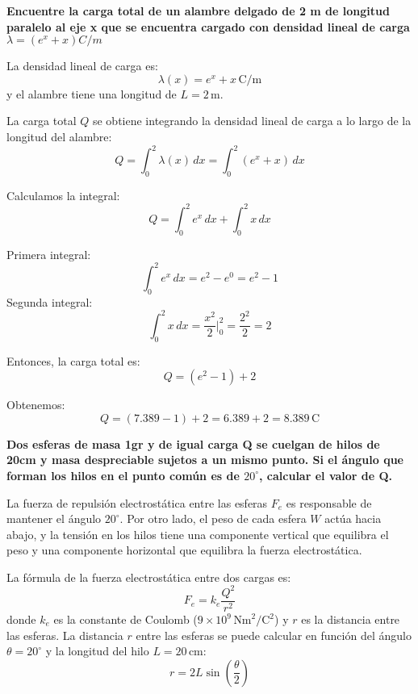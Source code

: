 \documentclass[answers]{exam} %
\begin{document}
\begin{questions}
	\vspace{0.5cm}

	\question \large\textbf{Encuentre la carga total de un alambre delgado de 2 m de longitud paralelo al eje x que se encuentra cargado con densidad lineal de carga $\lambda = (e^x + x) C/m$  }

	\vspace{0.5cm}

	\begin{multicols}{2} %
		La densidad lineal de carga es:
		\[
			\lambda(x) = e^x + x \, \text{C/m}
		\]
		y el alambre tiene una longitud de \( L = 2 \, \text{m} \).

		La carga total \( Q \) se obtiene integrando la densidad lineal de carga a lo largo de la longitud del alambre:
		\[
			Q = \int_0^2 \lambda(x) \, dx = \int_0^2 (e^x + x) \, dx
		\]

		Calculamos la integral:
		\[
			Q = \int_0^2 e^x \, dx + \int_0^2 x \, dx
		\]

		Primera integral:
		\[
			\int_0^2 e^x \, dx = e^2 - e^0 = e^2 - 1
		\]
		Segunda integral:
		\[
			\int_0^2 x \, dx = \frac{x^2}{2} \Bigg|_0^2 = \frac{2^2}{2} = 2
		\]

		Entonces, la carga total es:
		\[
			Q = (e^2 - 1) + 2
		\]

		Obtenemos:
		\[
			Q = (7.389 - 1) + 2 = 6.389 + 2 = 8.389 \, \text{C}
		\]
	\end{multicols}

	\vspace{0.5cm}

	\question \large\textbf{Dos esferas de masa 1gr y de igual carga Q se cuelgan de hilos de 20cm y masa despreciable sujetos a un mismo punto. Si el ángulo que forman los hilos en el punto
		común es de $20^{\circ}$, calcular el valor de Q.  }

	\begin{multicols}{2} %

		La fuerza de repulsión electrostática entre las esferas \( F_e \) es responsable de mantener el ángulo \( 20^\circ \). Por otro lado, el peso de cada esfera \( W \) actúa hacia abajo, y la tensión en los hilos tiene una componente vertical que equilibra el peso y una componente horizontal que equilibra la fuerza electrostática.

		La fórmula de la fuerza electrostática entre dos cargas es:
		\[
			F_e = k_e \frac{Q^2}{r^2}
		\]
		donde \( k_e \) es la constante de Coulomb (\( 9 \times 10^9 \, \text{Nm}^2/\text{C}^2 \)) y \( r \) es la distancia entre las esferas. La distancia \( r \) entre las esferas se puede calcular en función del ángulo \( \theta = 20^\circ \) y la longitud del hilo \( L = 20 \, \text{cm} \):
		\[
			r = 2L \sin\left(\frac{\theta}{2}\right)
		\]


\end{multicols}
\end{questions}
\end{document}
